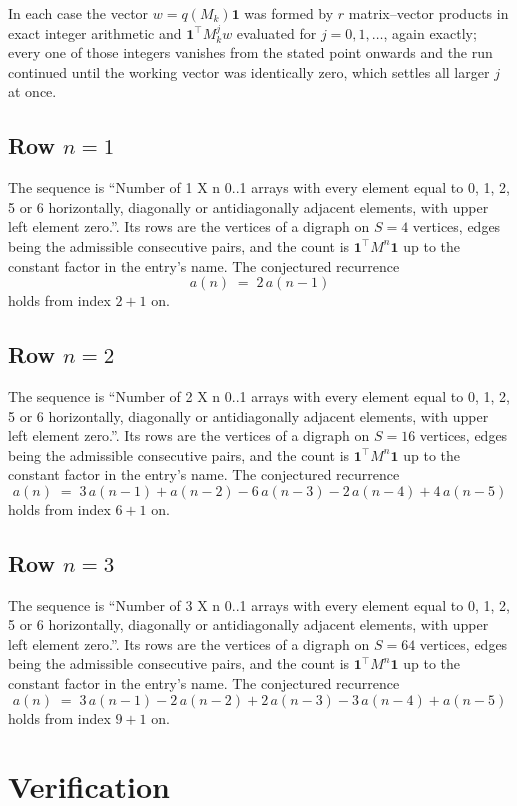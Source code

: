 \documentclass[11pt,a4paper]{article}
\theoremstyle{plain}
\theoremstyle{definition}
\begin{document}
In each case the vector $w=q(M_k)\mathbf{1}$ was formed by $r$ matrix--vector products in
exact integer arithmetic and $\mathbf{1}^{\!\top}M_k^{j}w$ evaluated for $j=0,1,\dots$,
again exactly; every one of those integers vanishes from the stated point onwards and the run
continued until the working vector was identically zero, which settles all larger $j$ at once.

\subsection*{Row $n$$=1$}
The sequence is ``Number of 1 X n 0..1 arrays with every element equal to 0, 1, 2, 5 or 6 horizontally, diagonally or antidiagonally adjacent elements, with upper left element zero.''. Its rows are the vertices of a digraph on
$S=4$ vertices, edges being the admissible consecutive pairs, and the count is
$\mathbf{1}^{\!\top}M^{n}\mathbf{1}$ up to the constant factor in the entry's name.
The conjectured recurrence
\[
a(n)\;=\;2\,a(n-1)
\]
holds from index $2+1$ on.

\subsection*{Row $n$$=2$}
The sequence is ``Number of 2 X n 0..1 arrays with every element equal to 0, 1, 2, 5 or 6 horizontally, diagonally or antidiagonally adjacent elements, with upper left element zero.''. Its rows are the vertices of a digraph on
$S=16$ vertices, edges being the admissible consecutive pairs, and the count is
$\mathbf{1}^{\!\top}M^{n}\mathbf{1}$ up to the constant factor in the entry's name.
The conjectured recurrence
\[
a(n)\;=\;3\,a(n-1) + a(n-2) - 6\,a(n-3) - 2\,a(n-4) + 4\,a(n-5)
\]
holds from index $6+1$ on.

\subsection*{Row $n$$=3$}
The sequence is ``Number of 3 X n 0..1 arrays with every element equal to 0, 1, 2, 5 or 6 horizontally, diagonally or antidiagonally adjacent elements, with upper left element zero.''. Its rows are the vertices of a digraph on
$S=64$ vertices, edges being the admissible consecutive pairs, and the count is
$\mathbf{1}^{\!\top}M^{n}\mathbf{1}$ up to the constant factor in the entry's name.
The conjectured recurrence
\[
a(n)\;=\;3\,a(n-1) - 2\,a(n-2) + 2\,a(n-3) - 3\,a(n-4) + a(n-5)
\]
holds from index $9+1$ on.

\section{Verification}
\end{document}
